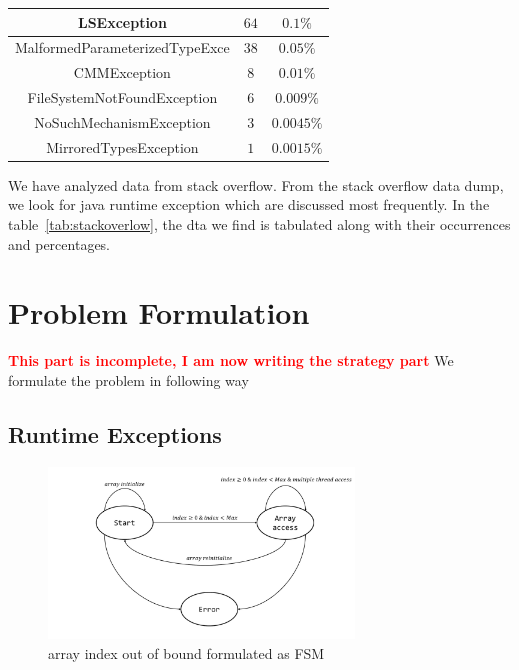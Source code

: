 \documentclass{sigplanconf}
\begin{document}
\begin{table}[h]
\begin{tabular}{|c|c|c|}
LSException & $64$ &  $0.1\%$ \\ \hline

MalformedParameterizedTypeExce & $38$ & $0.05\%$ \\ \hline

CMMException  & $8$ & $0.01\%$ \\ \hline

FileSystemNotFoundException & $6$ & $0.009\%$ \\ \hline

NoSuchMechanismException & $3$ & $0.0045\%$ \\ \hline

MirroredTypesException & $1$ & $0.0015\%$ \\ \hline

\end{tabular}
\end{table}



We have analyzed data from stack overflow. From the stack overflow data dump, we
look for java runtime exception which are discussed most frequently. In the
table~\ref{tab:stackoverlow}, the dta we find is tabulated along with their
occurrences and percentages.





\section{Problem Formulation}
\label{sec:form}

\textcolor{red}{\textbf{This part is incomplete, I am now writing the strategy part}}\newline
We formulate the problem in following way

\subsection{Runtime Exceptions}
\label{subsec:excep}

\begin{figure}[!htb]
\centering
\includegraphics[width=3.2in]{images/ArrayIndex.pdf}
\caption{array index out of bound formulated as FSM}
\label{fig:array}
\end{figure}
\end{document}
